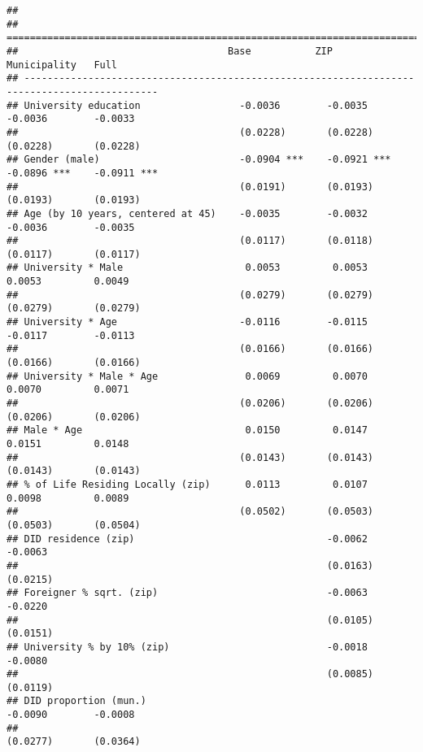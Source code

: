 \documentclass[
]{article}
\begin{document}
\begin{verbatim}
## 
## =============================================================================================
##                                    Base           ZIP            Municipality   Full         
## ---------------------------------------------------------------------------------------------
## University education                 -0.0036        -0.0035        -0.0036        -0.0033    
##                                      (0.0228)       (0.0228)       (0.0228)       (0.0228)   
## Gender (male)                        -0.0904 ***    -0.0921 ***    -0.0896 ***    -0.0911 ***
##                                      (0.0191)       (0.0193)       (0.0193)       (0.0193)   
## Age (by 10 years, centered at 45)    -0.0035        -0.0032        -0.0036        -0.0035    
##                                      (0.0117)       (0.0118)       (0.0117)       (0.0117)   
## University * Male                     0.0053         0.0053         0.0053         0.0049    
##                                      (0.0279)       (0.0279)       (0.0279)       (0.0279)   
## University * Age                     -0.0116        -0.0115        -0.0117        -0.0113    
##                                      (0.0166)       (0.0166)       (0.0166)       (0.0166)   
## University * Male * Age               0.0069         0.0070         0.0070         0.0071    
##                                      (0.0206)       (0.0206)       (0.0206)       (0.0206)   
## Male * Age                            0.0150         0.0147         0.0151         0.0148    
##                                      (0.0143)       (0.0143)       (0.0143)       (0.0143)   
## % of Life Residing Locally (zip)      0.0113         0.0107         0.0098         0.0089    
##                                      (0.0502)       (0.0503)       (0.0503)       (0.0504)   
## DID residence (zip)                                 -0.0062                       -0.0063    
##                                                     (0.0163)                      (0.0215)   
## Foreigner % sqrt. (zip)                             -0.0063                       -0.0220    
##                                                     (0.0105)                      (0.0151)   
## University % by 10% (zip)                           -0.0018                       -0.0080    
##                                                     (0.0085)                      (0.0119)   
## DID proportion (mun.)                                              -0.0090        -0.0008    
##                                                                    (0.0277)       (0.0364)   

\end{verbatim}
\end{document}
